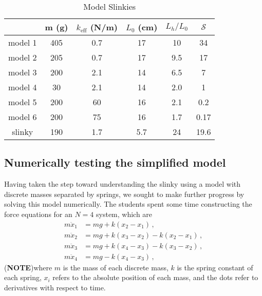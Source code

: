 \documentclass[aps,pre,10pt,superscriptaddress,showpacs,amsmath,amssymb,nofootinbib]{revtex4-1}
\newcommand{\NOTEMARG}[1]{\marginpar{\raggedright\scriptsize\textbf{NOTE:} #1} (\textbf{NOTE})}
\newcommand{\eq}[1]{eq.~\eqref{eq:#1}}
\newcommand{\nn}{\nonumber}
\begin{document}
\begin{table}[ht]
\caption{Model Slinkies} %
\centering %
\begin{tabular}{c c c c c c} %
\hline\hline %
 & m (g) & $k_\text{eff}$ (N/m) & $L_0$ (cm) & $L_h/L_0$ & $\mathcal{S}$ \\ [0.5ex] %
\hline %
model 1 & 405 & 0.7 	& 17   & 10	& 34		\\ %
model 2 & 205 & 0.7	& 17   & 9.5	& 17		\\
model 3 & 200 & 2.1	& 14   & 6.5	& 7		\\
model 4 & 30   & 2.1	& 14   & 2.0	& 1		\\
model 5 & 200 & 60	& 16   & 2.1	& 0.2		\\
model 6 & 200 & 75	& 16   & 1.7	& 0.17		\\
slinky     & 190 & 1.7   & 5.7   & 24	& 19.6		\\ [1ex] %
\hline %
\end{tabular}
\label{table:slinkies} %
\end{table}
 


\subsection{Numerically testing the simplified model}
\label{subsec:forcesnumeric}
Having taken the step toward understanding the slinky using a model with
discrete masses separated by springs, we sought to make further progress by
solving this model numerically. The students spent some time constructing the
force equations for an $N=4$ system, which are
\begin{align} \label{eq:coupleddes}
m\ddot{x}_1 &= mg + k(x_2 - x_1)\,,
\nn\\
m\ddot{x}_2 &= mg + k(x_3 - x_2) - k(x_2 - x_1)
\,,\nn\\
m\ddot{x}_3 &= mg + k(x_4 - x_3) - k(x_3 - x_2)
\,,\nn\\
m\ddot{x}_4 &= mg                - k(x_4 - x_3)
\,,\end{align}
\NOTEMARG{CB: include \eq{coupleddes}?}where $m$ is the mass of each discrete mass, $k$ is the spring constant of each
spring, $x_i$ refers to the absolute position of each mass, and the dots refer to
derivatives with respect to time.
\end{document}
